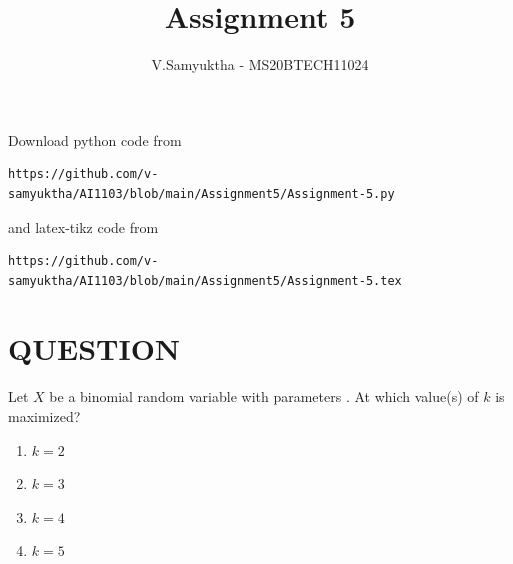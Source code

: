 \documentclass[journal,12pt,twocolumn]{IEEEtran}
\begin{document}
     \def\rightbox#1{\makebox[0in][r]{#1}}
     \def\centbox#1{\makebox[0in]{#1}}
     \def\topbox#1{\raisebox{-\baselineskip}[0in][0in]{#1}}
     \def\midbox#1{\raisebox{-0.5\baselineskip}[0in][0in]{#1}}
\vspace{3cm}
\title{Assignment 5}
\author{V.Samyuktha - MS20BTECH11024}
\maketitle
\newpage
\bigskip
\renewcommand{\thefigure}{\theenumi}
\renewcommand{\thetable}{\theenumi}
Download python code from 
\begin{lstlisting}
https://github.com/v-samyuktha/AI1103/blob/main/Assignment5/Assignment-5.py
\end{lstlisting}
%
and latex-tikz code from 
%
\begin{lstlisting}
https://github.com/v-samyuktha/AI1103/blob/main/Assignment5/Assignment-5.tex
\end{lstlisting}
\section{\textbf{QUESTION}}
Let $X$ be a binomial random variable with parameters . At which value(s) of $k$ is  maximized?\\
\begin{enumerate}
\item $k=2$ 
\item $k=3$ 
\item $k=4$ 
\item $k=5$
\end{enumerate}
\end{document}
